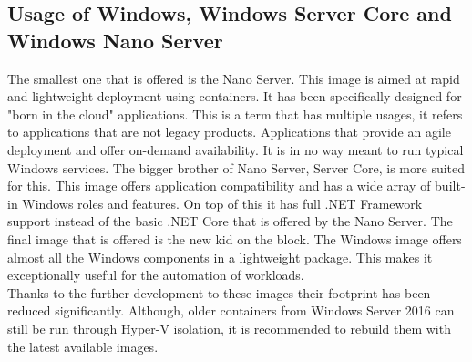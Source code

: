 \subsection{Usage of Windows, Windows Server Core and Windows Nano Server}
The smallest one that is offered is the Nano Server. This image is aimed at rapid and lightweight deployment using containers. It has been specifically designed for "born in the cloud" applications. This is a term that has multiple usages, it refers to applications that are not legacy products. Applications that provide an agile deployment and offer on-demand availability. It is in no way meant to run typical Windows services. The bigger brother of Nano Server, Server Core, is more suited for this. 
This image offers application compatibility and has a wide array of built-in Windows roles and features. On top of this it has full .NET Framework support instead of the basic .NET Core that is offered by the Nano Server. 
The final image that is offered is the new kid on the block. The Windows image offers almost all the Windows components in a lightweight package. This makes it exceptionally useful for the automation of workloads. 
\\
Thanks to the further development to these images their footprint has been reduced significantly. Although, older containers from Windows Server 2016 can still be run through Hyper-V isolation, it is recommended to rebuild them with the latest available images.




